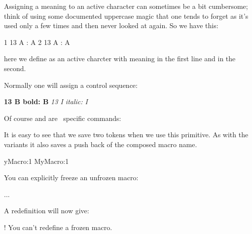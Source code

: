 \stopoldprimitive

\startnewprimitive[title={\prm {letcharcode}}]

Assigning a meaning to an active character can sometimes be a bit cumbersome;
think of using some documented uppercase magic that one tends to forget as it's
used only a few times and then never looked at again. So we have this:

\startbuffer
{ 1  13 A : \meaning A}\crlf
{ 2  13 A : \meaning A}\par
\stopbuffer

\typebuffer

here we define  as an active charcter with meaning  in the
first line and  in the second.

{\tttf \getbuffer}

Normally one will assign a control sequence:

\startbuffer
{ \bf {} 13 {B   bold}: \meaning B}\crlf
{ \it {} 13 {I italic}: \meaning I}\par
\stopbuffer

\typebuffer

Of course \type {\bf} and \type {\it} are \CONTEXT\ specific commands:

{\tttf \getbuffer}

\stopnewprimitive

\startnewprimitive[title={\prm {letcsname}}]

It is easy to see that we save two tokens when we use this primitive. As with the
 variants it also saves a push back of the composed macro name.

\starttyping
\expandafter\let\csname MyMacro:1\endcsname\relax
              MyMacro:1\endcsname\relax
\stoptyping

\stopnewprimitive

\startnewprimitive[title={\prm {letfrozen}}]

You can explicitly freeze an unfrozen macro:

\starttyping
\def\MyMacro{...}
\MyMacro
\stoptyping

A redefinition will now give:

\starttyping
! You can't redefine a frozen macro.
\stoptyping

\stopnewprimitive

\startnewprimitive[title={\prm {letmathatomrule}}]

